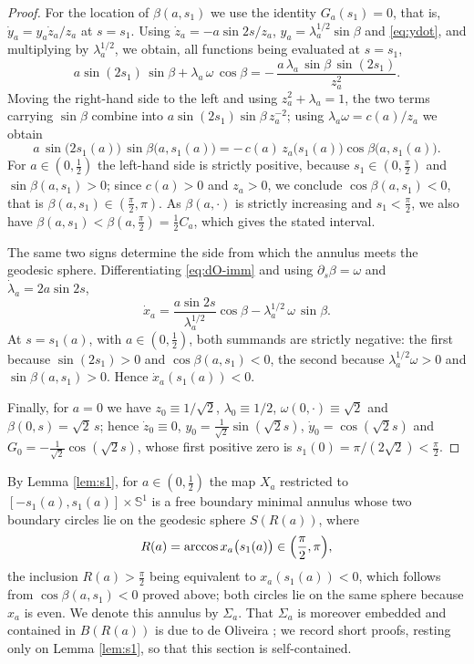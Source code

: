 \documentclass[11pt,a4paper]{amsart}
\theoremstyle{plain}
\theoremstyle{definition}
\newcommand{\Sph}{\mathbb{S}}
\begin{document}
\begin{proof}
For the location of $\beta(a,s_1)$ we use the identity $G_a(s_1)=0$, that is, $\dot y_a=y_a\dot z_a/z_a$ at $s=s_1$. Using $\dot z_a=-a\sin2s/z_a$, $y_a=\lambda_a^{1/2}\sin\beta$ and \eqref{eq:ydot}, and multiplying by $\lambda_a^{1/2}$, we obtain, all functions being evaluated at $s=s_1$,
\[
a\sin (2s_1)\,\sin\beta+\lambda_a\,\omega\,\cos\beta=-\,\frac{a\,\lambda_a\,\sin\beta\,\sin (2s_1)}{z_a^{2}} .
\]
Moving the right-hand side to the left and using $z_a^2+\lambda_a=1$, the two terms carrying $\sin\beta$ combine into $a\sin(2s_1)\sin\beta\,z_a^{-2}$; using $\lambda_a\omega=c(a)/z_a$ we obtain
\begin{equation}\label{eq:fbc-clean}
a\,\sin\bigl(2s_1(a)\bigr)\,\sin\beta\bigl(a,s_1(a)\bigr)=-\,c(a)\,z_a\bigl(s_1(a)\bigr)\cos\beta\bigl(a,s_1(a)\bigr).
\end{equation}
For $a\in(0,\tfrac12)$ the left-hand side is strictly positive, because $s_1\in(0,\tfrac\pi2)$ and $\sin\beta(a,s_1)>0$; since $c(a)>0$ and $z_a>0$, we conclude $\cos\beta(a,s_1)<0$, that is $\beta(a,s_1)\in(\tfrac\pi2,\pi)$. As $\beta(a,\cdot)$ is strictly increasing and $s_1<\tfrac\pi2$, we also have $\beta(a,s_1)<\beta(a,\tfrac\pi2)=\tfrac12C_a$, which gives the stated interval.

The same two signs determine the side from which the annulus meets the geodesic sphere. Differentiating \eqref{eq:dO-imm} and using $\partial_s\beta=\omega$ and $\dot\lambda_a=2a\sin 2s$,
\[
\dot x_a=\frac{a\sin 2s}{\lambda_a^{1/2}}\cos\beta-\lambda_a^{1/2}\,\omega\,\sin\beta .
\]
At $s=s_1(a)$, with $a\in(0,\tfrac12)$, both summands are strictly negative: the first because $\sin(2s_1)>0$ and $\cos\beta(a,s_1)<0$, the second because $\lambda_a^{1/2}\omega>0$ and $\sin\beta(a,s_1)>0$. Hence $\dot x_a(s_1(a))<0$.

Finally, for $a=0$ we have $z_0\equiv 1/\sqrt2$, $\lambda_0\equiv 1/2$, $\omega(0,\cdot)\equiv\sqrt2$ and $\beta(0,s)=\sqrt2\,s$; hence $\dot z_0\equiv 0$, $y_0=\tfrac1{\sqrt2}\sin(\sqrt2 s)$, $\dot y_0=\cos(\sqrt2 s)$ and $G_0=-\tfrac1{\sqrt2}\cos(\sqrt2 s)$, whose first positive zero is $s_1(0)=\pi/(2\sqrt2)<\tfrac\pi2$.
\end{proof}

By Lemma \ref{lem:s1}, for $a\in(0,\tfrac12)$ the map $X_a$ restricted to $[-s_1(a),s_1(a)]\times\Sph^1$ is a free boundary minimal annulus whose two boundary circles lie on the geodesic sphere $S(R(a))$, where
\begin{equation}\label{eq:Rdef}
R(a)=\arccos x_a\bigl(s_1(a)\bigr)\in\Bigl(\frac\pi2,\pi\Bigr),
\end{equation}
the inclusion $R(a)>\tfrac\pi2$ being equivalent to $x_a(s_1(a))<0$, which follows from $\cos\beta(a,s_1)<0$ proved above; both circles lie on the same sphere because $x_a$ is even. We denote this annulus by $\Sigma_a$. That $\Sigma_a$ is moreover embedded and contained in $B(R(a))$ is due to de Oliveira \textup{\cite[Prop. 3.3 and Prop. 3.4]{dO24}}; we record short proofs, resting only on Lemma \ref{lem:s1}, so that this section is self-contained.
\end{document}
